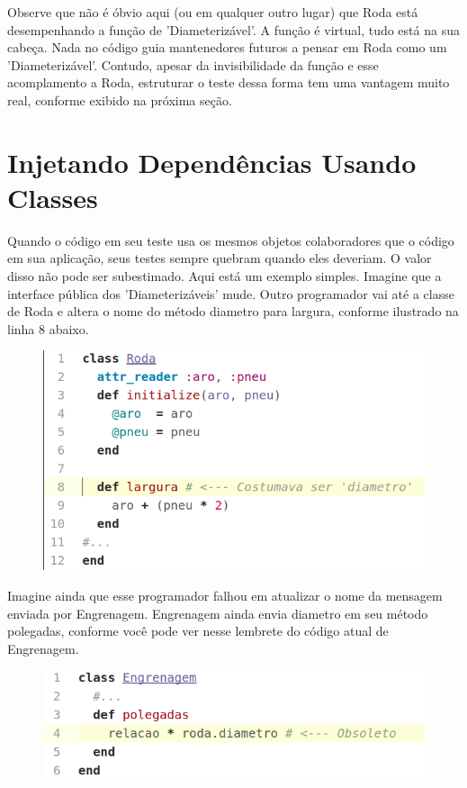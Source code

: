 Observe que não é óbvio aqui (ou em qualquer outro lugar) que Roda está
desempenhando a função de 'Diameterizável'. A função é virtual, tudo está na sua
cabeça. Nada no código guia mantenedores futuros a pensar em Roda como um
'Diameterizável'. Contudo, apesar da invisibilidade da função e esse
acomplamento a Roda, estruturar o teste dessa forma tem uma vantagem muito real,
conforme exibido na próxima seção.

\section{Injetando Dependências Usando Classes}

Quando o código em seu teste usa os mesmos objetos colaboradores que o código em
sua aplicação, seus testes sempre quebram quando eles deveriam. O valor disso
não pode ser subestimado.
Aqui está um exemplo simples. Imagine que a interface pública dos
'Diameterizáveis' mude. Outro programador vai até a classe de Roda e altera o
nome do método diametro para largura, conforme ilustrado na linha 8 abaixo.

\begin{figure}[!htbp]
  \center
  \includegraphics[scale=0.50]{imagens/codigo_pag_207_a.png}
  \label{img:codigo_pag_207_a}
\end{figure}

Imagine ainda que esse programador falhou em atualizar o nome da mensagem
enviada por Engrenagem. Engrenagem ainda envia diametro em seu método polegadas,
conforme você pode ver nesse lembrete do código atual de Engrenagem.

\begin{figure}[!htbp]
  \center
  \includegraphics[scale=0.50]{imagens/codigo_pag_207_b.png}
  \label{img:codigo_pag_207_b}
\end{figure}


